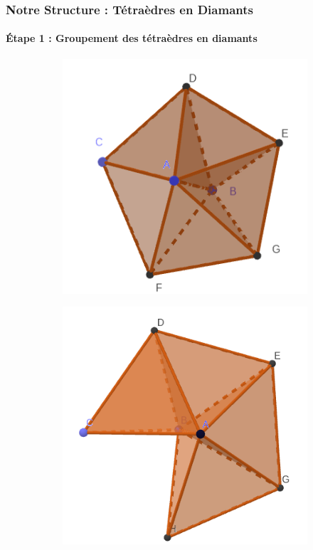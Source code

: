 \documentclass[9pt]{beamer}
\begin{document}
\begin{frame}
\small
\frametitle{Notre Structure : Tétraèdres en Diamants}
\framesubtitle{\'{E}tape 1 : Groupement des tétraèdres en diamants}
\begin{figure}[H]
\centering
\begin{subfigure}{.24\textwidth}
  \centering
  \includegraphics[scale=0.21]{../Images/full_diamond}
  \caption{}
\end{subfigure}%
\begin{subfigure}{.24\textwidth}
  \centering
  \includegraphics[scale=0.17]{../Images/not_full_diamond}
  \caption{}
\end{subfigure}
\begin{subfigure}{.24\textwidth}
  \centering

\end{subfigure}
\end{figure}
\end{frame}
\end{document}
